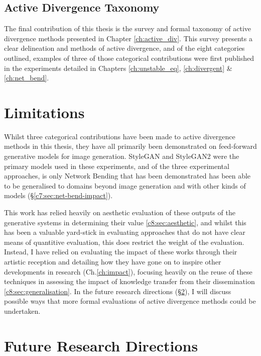 \subsection{Active Divergence Taxonomy}

The final contribution of this thesis is the survey and formal taxonomy of active divergence methods presented in Chapter \ref{ch:active_div}.
This survey presents a clear delineation and methods of active divergence, and of the eight categories outlined, examples of three of those categorical contributions were first published in the experiments detailed in Chapters \ref{ch:unstable_eq}, \ref{ch:divergent}  \& \ref{ch:net_bend}.

\section{Limitations}
\label{c9:sec:limitations}

Whilst three categorical contributions have been made to active divergence methods in this thesis, they have all primarily been demonstrated on feed-forward generative models for image generation.
StyleGAN \citep{karras2019style} and StyleGAN2 \citep{karras2019analyzing} were the primary models used in these experiments, and of the three experimental approaches, is only Network Bending that has been demonstrated has been able to be generalised to domains beyond image generation and with other kinds of models (\S \ref{c7:sec:net-bend-impact}).

This work has relied heavily on aesthetic evaluation of these outputs of the generative systems in determining their value \ref{c8:sec:aesthetic}, and whilst this has been a valuable yard-stick in evaluating approaches that do not have clear means of quantitive evaluation, this does restrict the weight of the evaluation.
Instead, I have relied on evaluating the impact of these works through their artistic reception and detailing how they have gone on to inspire other developments in research (Ch.\ref{ch:impact}), focusing heavily on the reuse of these techniques in assessing the impact of knowledge transfer from their dissemination \ref{c8:sec:generalisation}.
In the future research directions (\S \ref{c9:sec:future}), I will discuss possible ways that more formal evaluations of active divergence methods could be undertaken.

\section{Future Research Directions}
\label{c9:sec:future}

